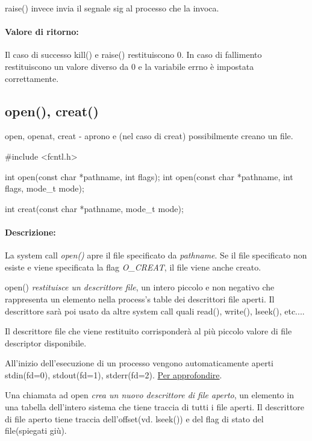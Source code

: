 \documentclass
[10pt,        %
 a4paper,     %
 onecolumn,   %
 fleqn,       %
 oneside,     %
 notitlepage, %
]{article}    %
\begin{document}
raise() invece invia il segnale sig al processo che la invoca.



\paragraph{Valore di ritorno:}
Il caso di successo kill() e raise() restituiscono 0.
In caso di fallimento restituiscono un valore diverso da 0 e la variabile errno è impostata correttamente.

\subsection{open(), creat()}
open, openat, creat - aprono e (nel caso di creat) possibilmente creano un file.

\begin{C}
#include <fcntl.h>

int open(const char *pathname, int flags);
int open(const char *pathname, int flags, mode_t mode);

int creat(const char *pathname, mode_t mode);
\end{C}

\paragraph{Descrizione:}
La system call \textit{open()} apre il file specificato da \textit{pathname}. Se il file specificato non esiste e viene specificata la flag \textit{O\_CREAT}, il file viene anche creato.

open() \textit{restituisce un descrittore file}, un intero piccolo e non negativo che rappresenta un elemento nella process's table dei descrittori file aperti. Il descrittore sarà poi usato da altre system call quali read(), write(), lseek(), etc....

Il descrittore file che viene restituito corrisponderà al più piccolo valore di file descriptor disponibile.

All'inizio dell'esecuzione di un processo vengono automaticamente aperti stdin(fd=0), stdout(fd=1), stderr(fd=2). \href{https://stackoverflow.com/questions/22367920/is-it-possible-that-linux-file-descriptor-0-1-2-not-for-stdin-stdout-and-stderr}{Per approfondire}.

Una chiamata ad open \textit{crea un nuovo descrittore di file aperto}, un elemento in una tabella dell'intero sistema che tiene traccia di tutti i file aperti. Il descrittore di file aperto tiene traccia dell'offset(vd. lseek()) e del flag di stato del file(spiegati giù).
\end{document}
